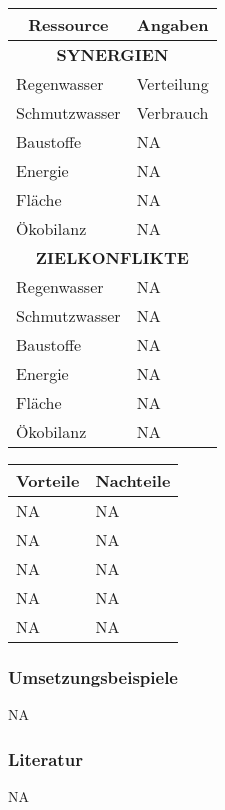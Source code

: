 \documentclass[
]{article}
\begin{document}
\begin{center}
\begin{tabularx}{\textwidth}{|X|X|}
\hline
\multicolumn{1}{|c|}{\textbf{Ressource}} & \multicolumn{1}{|c|}{\textbf{Angaben}} \tabularnewline
\hline
\multicolumn{2}{|c|}{ \textbf{SYNERGIEN} } \tabularnewline
\hline
Regenwasser & Verteilung\\
\hline
Schmutzwasser & Verbrauch\\
\hline
Baustoffe & NA\\
\hline
Energie & NA\\
\hline
Fläche & NA\\
\hline
Ökobilanz & NA\\
\hline
\multicolumn{2}{|c|}{ \textbf{ZIELKONFLIKTE} } \\
\hline
Regenwasser & NA\\
\hline
Schmutzwasser & NA\\
\hline
Baustoffe & NA\\
\hline
Energie & NA\\
\hline
Fläche & NA\\
\hline
Ökobilanz & NA\\
\hline
\end{tabularx}
\end{center}

\begin{center}
\begin{tabularx}{\textwidth}{|X|X|}
\hline
\multicolumn{1}{|c|}{\textbf{Vorteile}} & \multicolumn{1}{|c|}{\textbf{Nachteile}} \tabularnewline
\hline
NA & NA\\
\hline
NA & NA\\
\hline
NA & NA\\
\hline
NA & NA\\
\hline
NA & NA\\
\hline
\end{tabularx}
\end{center}

\hypertarget{umsetzungsbeispiele}{%
\subsubsection{Umsetzungsbeispiele}\label{umsetzungsbeispiele}}

NA

\hypertarget{literatur}{%
\subsubsection{Literatur}\label{literatur}}

NA
\end{document}
